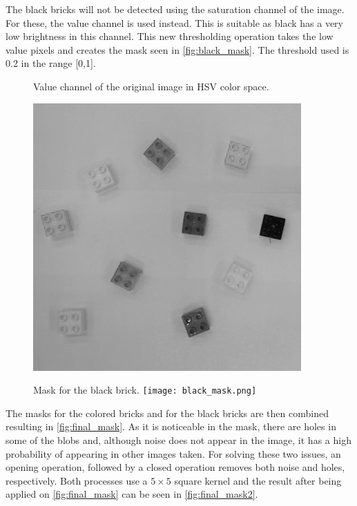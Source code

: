 The black bricks will not be detected using the saturation channel of the image. For these, the value channel is used instead. This is suitable as black has a very low brightness in this channel. This new thresholding operation takes the low value pixels and creates the mask seen in \autoref{fig:black_mask}. The threshold used is 0.2 in the range [0,1].
\begin{figure}[H]
	\captionbox  %
	{
		Value channel of the original image in HSV color space.                
		\label{fig:value}                                  
	}                                                                 
	{       
		
		\includegraphics[width=.25\textwidth]{figures/value.png}         
	}                                                                    
	\hspace{5pt}                                                          
	\captionbox
	{  
		Mask for the black brick.
		\label{fig:black_mask}                                     
	}
	{
		\texttt{[image: black\_mask.png]}            
	}                                                                             
\end{figure}
The masks for the colored bricks and for the black bricks are then combined resulting in \autoref{fig:final_mask}. As it is noticeable in the mask, there are holes in some of the blobs and, although noise does not appear in the image, it has a high probability of appearing in other images taken. For solving these two issues, an opening operation, followed by a closed operation removes both noise and holes, respectively. Both processes use a $5\times 5$ square kernel and the result after being applied on \autoref{fig:final_mask} can be seen in \autoref{fig:final_mask2}. 
%

